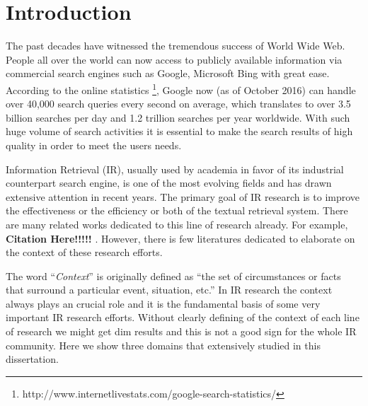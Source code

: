 %
%
\chapter{Introduction}
The past decades have witnessed the tremendous success of World Wide Web. 
People all over the world can now access to publicly available 
information via commercial search engines such as Google, Microsoft Bing 
with great ease. According to the online statistics 
\footnote{http://www.internetlivestats.com/google-search-statistics/}, 
Google now (as of October 2016) can handle over 40,000 search queries 
every second on average, which translates to over 3.5 billion searches 
per day and 1.2 trillion searches per year worldwide. 
With such huge volume of search activities it is essential to make the 
search results of high quality in order to meet the users needs.

Information Retrieval (IR), usually used by academia in favor of its 
industrial counterpart search engine, is one of the most evolving fields and 
has drawn extensive attention in recent years.
The primary goal of IR research is to improve the effectiveness or the 
efficiency or both of the textual retrieval system. 
There are many related works dedicated to this line of research already. 
For example, \textbf{Citation Here!!!!!} \cite{Singhal:1996:PDL:243199.243206}. 
However, there is few literatures dedicated to elaborate on the context 
of these research efforts.

The word ``\textit{Context}'' is originally defined as 
``the set of circumstances or facts that surround a particular event, situation, etc.'' 
In IR research the context always plays an crucial role and it is the 
fundamental basis of some very important IR research efforts. 
Without clearly defining of the context of each line of research we might get  
dim results and this is not a good sign for the whole IR community. 
Here we show three domains that extensively studied in this dissertation. 

